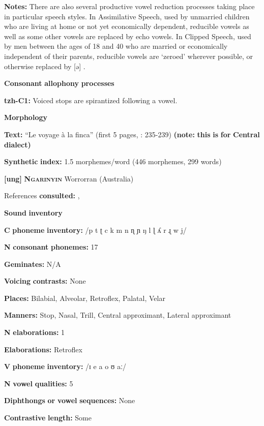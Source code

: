 \textbf{Notes:} There are also several productive vowel reduction processes taking place in particular speech styles. In Assimilative Speech, used by unmarried children who are living at home or not yet economically dependent, reducible vowels as well as some other vowels are replaced by echo vowels. In Clipped Speech, used by men between the ages of 18 and 40 who are married or economically independent of their parents, reducible vowels are ‘zeroed’ wherever possible, or otherwise replaced by [ə] \citep[26-7]{Kaufman1971}.

\textbf{Consonant} \textbf{allophony} \textbf{processes}

\textbf{tzh-C1:} Voiced stops are spirantized following a vowel. \citep[11]{Kaufman1971}

\textbf{Morphology}

\textbf{Text:} “Le voyage à la finca” (first 5 pages, \citealt{Polian2006}: 235-239) \textbf{(note:} \textbf{this} \textbf{is} \textbf{for} \textbf{Central} \textbf{dialect)}

\textbf{Synthetic} \textbf{index:} 1.5 morphemes/word (446 morphemes, 299 words)

\textbf{[ung]}   \textbf{\textsc{Ngarinyin}}  Worrorran (Australia)

References \textbf{consulted:} \citet{CoateOates1970}, \citet{Rumsey1978}

\textbf{Sound} \textbf{inventory}

\textbf{C} \textbf{phoneme} \textbf{inventory:} /p t ʈ c k m n ɳ ɲ ŋ l ɭ ʎ r ɻ w j/

\textbf{N} \textbf{consonant} \textbf{phonemes:} 17

\textbf{Geminates:} N/A

\textbf{Voicing} \textbf{contrasts:} None

\textbf{Places:} Bilabial, Alveolar, Retroflex, Palatal, Velar

\textbf{Manners:} Stop, Nasal, Trill, Central approximant, Lateral approximant

\textbf{N} \textbf{elaborations:} 1

\textbf{Elaborations:} Retroflex

\textbf{V} \textbf{phoneme} \textbf{inventory:} /ɪ e a o ʊ aː/

\textbf{N} \textbf{vowel} \textbf{qualities:} 5

\textbf{Diphthongs} \textbf{or} \textbf{vowel} \textbf{sequences:} None

\textbf{Contrastive} \textbf{length:} Some

